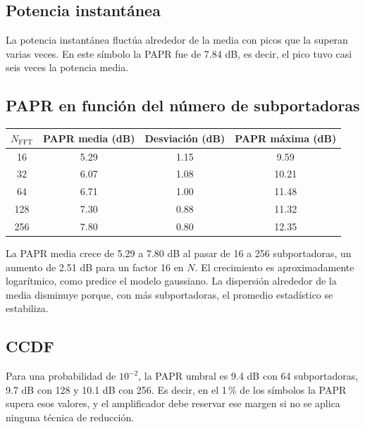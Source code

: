 \documentclass[11pt,a4paper]{article}
\begin{document}
\subsection{Potencia instantánea}


La potencia instantánea fluctúa alrededor de la media con picos que la superan varias
veces. En este símbolo la PAPR fue de 7.84 dB, es decir, el pico tuvo casi seis veces la
potencia media.

\subsection{PAPR en función del número de subportadoras}

\begin{tabular}{@{}cccc@{}}
  \toprule
  $N_{\mathrm{FFT}}$ & PAPR media (dB) & Desviación (dB) & PAPR máxima (dB) \\
  \midrule
  16  & 5.29 & 1.15 & 9.59 \\
  32  & 6.07 & 1.08 & 10.21 \\
  64  & 6.71 & 1.00 & 11.48 \\
  128 & 7.30 & 0.88 & 11.32 \\
  256 & 7.80 & 0.80 & 12.35 \\
  \bottomrule
\end{tabular}


La PAPR media crece de 5.29 a 7.80 dB al pasar de 16 a 256 subportadoras, un aumento de
2.51 dB para un factor 16 en $N$. El crecimiento es aproximadamente logarítmico, como
predice el modelo gaussiano. La dispersión alrededor de la media disminuye porque, con más
subportadoras, el promedio estadístico se estabiliza.

\subsection{CCDF}


Para una probabilidad de $10^{-2}$, la PAPR umbral es 9.4 dB con 64 subportadoras, 9.7 dB
con 128 y 10.1 dB con 256. Es decir, en el 1\,\% de los símbolos la PAPR supera esos
valores, y el amplificador debe reservar ese margen si no se aplica ninguna técnica de
reducción.
\end{document}
